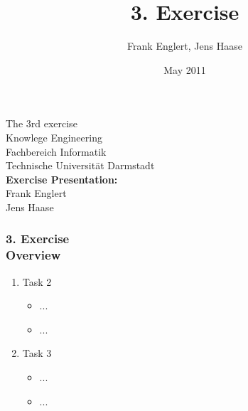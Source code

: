 \documentclass[accentcolor=tud1b,colorbacktitle,inverttitle,landscape,presentation,t]{tudbeamer}
\newcommand{\myframetitle}[2]{\frametitle{#1 \\[.2cm] \small #2}}
\begin{document}
\title[MGA]{\large 3. Exercise}

\author{Frank Englert, Jens Haase}


\date{May 2011}

\begin{titleframe}
\begin{center}
\color{tudtextaccent} \large The 3rd exercise\\[.5cm]
\normalcolor \normalsize Knowlege Engineering \\
Fachbereich Informatik \\
Technische Universität Darmstadt\\[.5cm]

\textbf{Exercise Presentation:}\\
Frank Englert\\
Jens Haase
\end{center}

\end{titleframe} 

\begin{frame}[c]
	\myframetitle{3. Exercise}{Overview}
\begin{enumerate}
  \item Task 2
  \begin{itemize}
  \item ...
  \item ...
\end{itemize}
  \item Task 3
  \begin{itemize}
  \item ...
  \item ...
\end{itemize}
\end{enumerate}
\end{frame}



\end{document}
